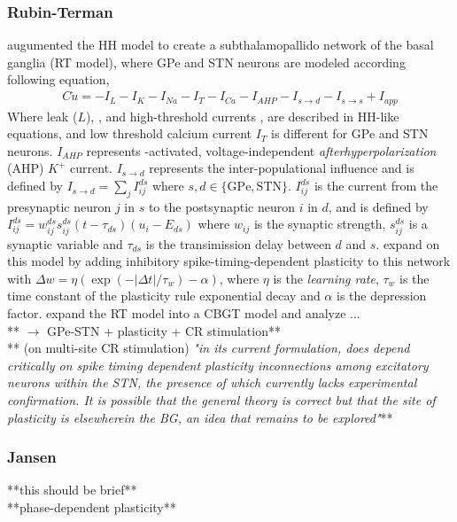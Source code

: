 \subsubsection{Rubin-Terman}
\cite{terman2002activity} augumented the HH model to create a subthalamopallido network of the
basal ganglia (RT model), where GPe and STN neurons are modeled according following equation,
\begin{align}
	C \dot u = - I_L - I_K - I_{Na} - I_T - I_{Ca} - I_{AHP} - I_{s \rightarrow d} -
	I_{s \rightarrow s} + I_{app}
\end{align}
Where leak ($L$), \K, \Na and high-threshold \Ca currents \cite{song2000characterization}, are
described in HH-like equations, and low threshold calcium current $I_T$ is different for GPe and
STN neurons. $I_{AHP}$ represents \Ca-activated, voltage-independent \textit{afterhyperpolarization}
(AHP) $K^+$ current. $I_{s \rightarrow d}$ represents the inter-populational influence and is
defined by
$I_{s \rightarrow d} = \sum_{j} I_{ij}^{ds}$ where $s, d \in \{\text{GPe}, \text{STN}\}$.
$I_{ij}^{ds}$ is the current from the presynaptic neuron $j$ in $s$ to the
postsynaptic neuron $i$ in $d$, and is defined by
$I_{ij}^{ds} = w_{ij}^{ds}s_{ij}^{ds}(t - \tau_{ds})(u_i - E_{ds})$ where $w_{ij}$ is the
synaptic strength, $s_{ij}^{ds}$ is a synaptic variable and $\tau_{ds}$ is the transimission
delay between $d$ and $s$.
\cite{madadi2022inhibitory} expand on this model by adding inhibitory spike-timing-dependent
plasticity to this network with $\Delta w = \eta(\exp(-|\Delta t| / \tau_w) - \alpha)$,
where $\eta$ is the \textit{learning rate}, $\tau_w$ is the time constant of the plasticity
rule exponential decay and $\alpha$ is the depression factor. \cite{rubin2012basal} expand
the RT model into a CBGT model and analyze ... \\
**\cite{hauptmann2009cumulative, hauptmann2010restoration} $\rightarrow$ GPe-STN + plasticity +
CR stimulation** \\
**\cite{rubin2012basal} (on multi-site CR stimulation) \emph{"in its current formulation, does
	depend critically on spike timing dependent plasticity inconnections among excitatory neurons
	within the STN, the presence of which currently lacks experimental confirmation. It is possible
	that the general theory is correct but that the site of plasticity is elsewherein the BG, an
	idea that remains to be explored"}**

\subsubsection{Jansen}
**this should be brief** \cite{jansen1995electroencephalogram} \cite{west2022stimulating} \\
**phase-dependent plasticity** \cite{duchet2023mean} \\


